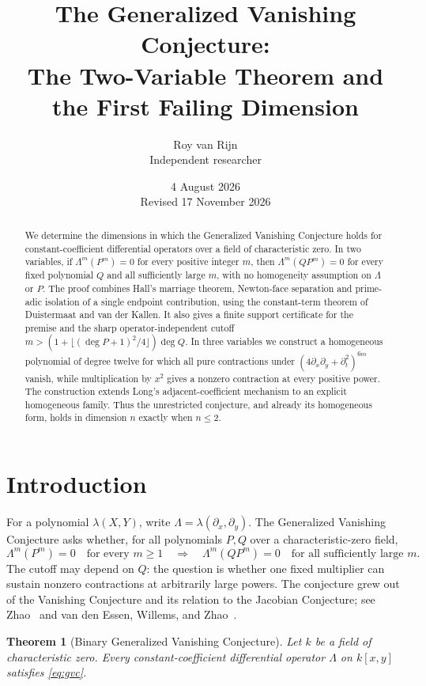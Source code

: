 \documentclass[11pt]{article}
\title{The Generalized Vanishing Conjecture:\\
The Two-Variable Theorem and the First Failing Dimension}
\author{Roy van Rijn\\{\small Independent researcher}}
\date{4 August 2026\\Revised 17 November 2026}
\newtheorem{theorem}{Theorem}[section]
\begin{document}
\maketitle

\begin{abstract}
We determine the dimensions in which the Generalized Vanishing Conjecture
holds for constant-coefficient differential operators over a field of
characteristic zero.  In two variables, if
$\Lambda^m(P^m)=0$ for every positive integer $m$, then
$\Lambda^m(QP^m)=0$ for every fixed polynomial $Q$ and all sufficiently
large $m$, with no homogeneity assumption on $\Lambda$ or $P$.
The proof combines Hall's marriage theorem, Newton-face separation and
prime-adic isolation of a single endpoint contribution, using the
constant-term theorem of Duistermaat and van der Kallen.
It also gives a finite support certificate for the premise and the sharp
operator-independent cutoff
$m>(1+\lfloor(\deg P+1)^2/4\rfloor)\deg Q$.
In three variables we construct a homogeneous polynomial of degree twelve
for which all pure contractions under
$(4\partial_x\partial_y+\partial_t^2)^{6m}$ vanish, while multiplication
by $x^2$ gives a nonzero contraction at every positive power.
The construction extends Long's adjacent-coefficient mechanism to an
explicit homogeneous family.  Thus the unrestricted conjecture, and
already its homogeneous form, holds in dimension $n$ exactly when $n\leq2$.
\end{abstract}

\section{Introduction}

For a polynomial $\lambda(X,Y)$, write
$\Lambda=\lambda(\partial_x,\partial_y)$.
The Generalized Vanishing Conjecture asks whether, for all polynomials
$P,Q$ over a characteristic-zero field,
\begin{equation}\label{eq:gvc}
 \Lambda^m(P^m)=0\quad\text{for every }m\geq1
 \quad\Longrightarrow\quad
 \Lambda^m(QP^m)=0\quad\text{for all sufficiently large }m.
\end{equation}
The cutoff may depend on $Q$: the question is whether one fixed
multiplier can sustain nonzero contractions at arbitrarily large powers.
The conjecture grew out of the Vanishing Conjecture and its relation to
the Jacobian Conjecture; see Zhao~\cite{Zhao} and van den Essen, Willems,
and Zhao~\cite{EWZ}.

\begin{theorem}[Binary Generalized Vanishing Conjecture]\label{thm:main}
Let $k$ be a field of characteristic zero.  Every constant-coefficient
differential operator $\Lambda$ on $k[x,y]$ satisfies
\eqref{eq:gvc}.
\end{theorem}
\end{document}
